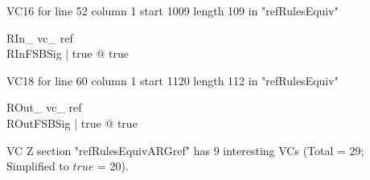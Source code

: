 \documentclass{article}
\begin{document}
VC16 for line 52 column 1 start 1009 length 109 in "refRulesEquiv"
\begin{theorem}{ RIn\_ vc\_ ref}\\
 \exists RInFSBSig | true @ true \\

\end{theorem}

VC18 for line 60 column 1 start 1120 length 112 in "refRulesEquiv"
\begin{theorem}{ ROut\_ vc\_ ref}\\
 \exists ROutFSBSig | true @ true \\

\end{theorem}



 VC Z section "refRulesEquivARGref" has $9$ interesting VCs (Total = 29; Simplified to $true$ = 20).



\end{document}
